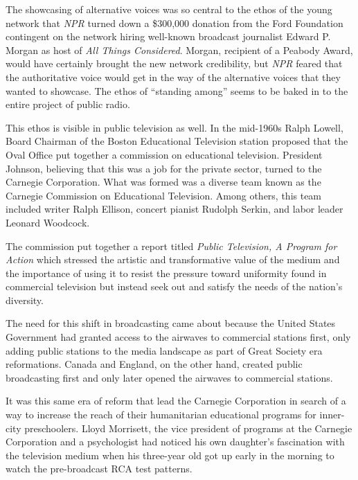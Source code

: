\documentclass[12pt,letterpaper]{article}
\begin{document}
	The showcasing of alternative voices was so central to the ethos of the
	young network that \textit{NPR} turned down a \$300,000 donation from 
	the Ford 
	Foundation contingent on the network hiring well-known broadcast
	journalist Edward P. Morgan as host of \textit{All Things Considered}. 
	Morgan, recipient of a Peabody Award, would have certainly 
	brought the new network
	credibility, but \textit{NPR} feared that the authoritative voice would
	get in the way of the alternative voices that they wanted to showcase.
	The ethos of ``standing among'' seems to be baked in to the entire
	project of public radio.

	This ethos is visible in public television as well. In the mid-1960s
	Ralph Lowell, Board Chairman of the Boston Educational Television 
	station proposed that the Oval Office put together a commission on 
	educational television. President Johnson, believing that this was
	a job for the private sector, turned to the Carnegie Corporation.
	What was formed was a diverse team known as the Carnegie Commission
	on Educational Television. Among others, this team included writer Ralph
	Ellison, concert pianist Rudolph Serkin, and labor leader Leonard 
	Woodcock.\autocite[409]{Meany}

	The commission put together a report titled \textit{Public Television, A 
	Program for Action} which stressed the artistic and transformative value
	of the medium and the importance of using it to resist the pressure 
	toward uniformity found in commercial television but instead seek out 
	and satisfy the needs of the nation's diversity.\autocite[410]{Meany}

	The need for this shift in broadcasting came about because the
	United States Government had granted access to the airwaves to 
	commercial stations
	first, only adding public stations to the media landscape as part of
	Great Society era reformations. Canada and England, on the other
	hand, created public broadcasting first and only later opened the
	airwaves to commercial stations.\autocite[412]{Meany}

	It was this same era of reform that lead the Carnegie Corporation
	in search of a way to increase the reach of their 
	humanitarian educational programs for inner-city preschoolers.
	\autocite[15]{Davis} Lloyd Morrisett, the vice president of programs at
	the Carnegie Corporation\autocite[7]{Cooney} and a psychologist
	\autocite[15]{Davis} had noticed his own daughter's fascination with
	the television medium when his three-year old got up early in the 
	morning to watch the pre-broadcast RCA test patterns.
	\autocite[11]{Davis}
	
\end{document}
